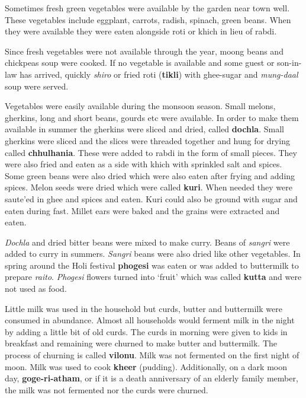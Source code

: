 Sometimes fresh green vegetables were available by the garden near town well.
These vegetables include eggplant, carrots, radish, spinach, green beans. When
they were available they were eaten alongside roti or khich in lieu of rabdi.

Since fresh vegetables were not available through the year, moong beans and
chickpeas soup were cooked. If no vegetable is available and some guest or
son-in-law has arrived, quickly \textit{shiro} or fried roti (\textbf{tikli})
with ghee-sugar and \textit{mung-daal} soup were served. 

Vegetables were easily available during the monsoon season. Small melons,
gherkins, long and short beans, gourds etc were available. In order
to make them available in summer the gherkins were sliced and dried,
called \textbf{dochla}. Small gherkins were sliced and the slices
were threaded together and hung for drying called
\textbf{chhulhania}. These were added to rabdi in the form of small
pieces. They were also fried and eaten as a side with khich with
sprinkled salt and spices. Some green beans were also dried which
were also eaten after frying and adding spices. Melon seeds were
dried which were called \textbf{kuri}. When needed they were
saut{e}'ed in ghee and spices and eaten. Kuri could also be ground
with sugar and eaten during fast. Millet ears were baked and the
grains were extracted and eaten.

\textit{Dochla} and dried bitter beans were mixed to make curry. Beans of
\textit{sangri} were added to curry in summers. \textit{Sangri} beans were also
dried like other vegetables. In spring around the Holi festival
\textbf{phogesi} was eaten or was added to buttermilk to prepare
\textit{raito}. \textit{Phogesi} flowers turned into `fruit' which was called
\textbf{kutta} and were not used as food.

Little milk was used in the household but curds, butter and buttermilk were
consumed in abundance. Almost all households would ferment milk in the night by
adding a little bit of old curds. The curds in morning were given to kids in
breakfast and remaining were churned to make butter and buttermilk. The process
of churning is called \textbf{vilonu}. Milk was not fermented on the first
night of moon. Milk was used to cook \textbf{kheer} (pudding). Additionally, on
a dark moon day, \textbf{goge-ri-atham}, or if it is a death anniversary of an
elderly family member, the milk was not fermented nor the curds were churned. 

